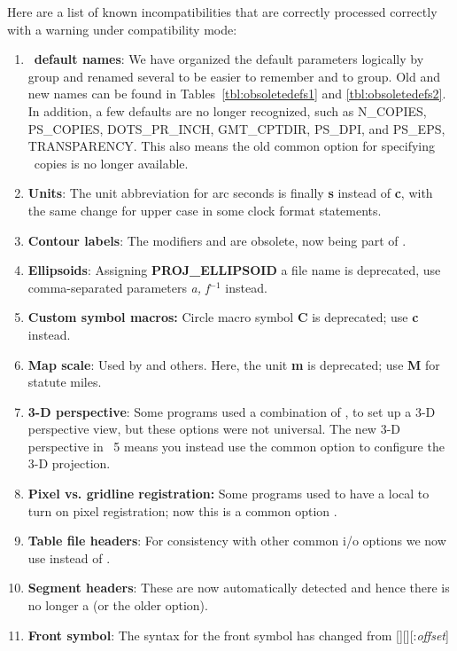 Here are a list of known incompatibilities that are correctly processed correctly with a warning under
compatibility mode:
\begin{enumerate}
	\item \gmt\ {\bf default names}: We have organized the default parameters logically by group and
		renamed several to be easier to remember and to group.  Old and new names can be
		found in Tables~\ref{tbl:obsoletedefs1} and \ref{tbl:obsoletedefs2}.  In addition, a few defaults are no longer
		recognized, such as N\_COPIES, PS\_COPIES, DOTS\_PR\_INCH, GMT\_CPTDIR, PS\_DPI, and PS\_EPS, TRANSPARENCY.
		This also means the old common option  for specifying \PS\ copies is no longer available.
	\item {\bf Units}: The unit abbreviation for arc seconds is finally {\bf s} instead of {\bf c},
		with the same change for upper case in some clock format statements.
	\item {\bf Contour labels}: The modifiers  and  are obsolete, now being part of .
	\item {\bf Ellipsoids}: Assigning {\bf PROJ\_ELLIPSOID} a file name is deprecated, use comma-separated parameters {\it a, f$^{-1}$} instead.
	\item {\bf Custom symbol macros:} Circle macro symbol {\bf C} is deprecated; use {\bf c} instead.
	\item {\bf Map scale}: Used by  and others.  Here, the unit {\bf m} is deprecated; use {\bf M} for statute miles.
	\item {\bf 3-D perspective}: Some programs used a combination of ,  to set up a 3-D perspective
		view, but these options were not universal.  The new 3-D perspective in \gmt\ 5 means you
		instead use the common option  to configure the 3-D projection.
	\item {\bf Pixel vs. gridline registration:} Some programs used to have a local  to turn on pixel registration;
		now this is a common option .
	\item {\bf Table file headers}: For consistency with other common i/o options we now use  instead of .
	\item {\bf Segment headers}: These are now automatically detected and hence there is no longer a  (or the older  option).
	\item {\bf Front symbol}: The syntax for the front symbol has changed from [][{][:{\it offset}]
}
\end{enumerate}
